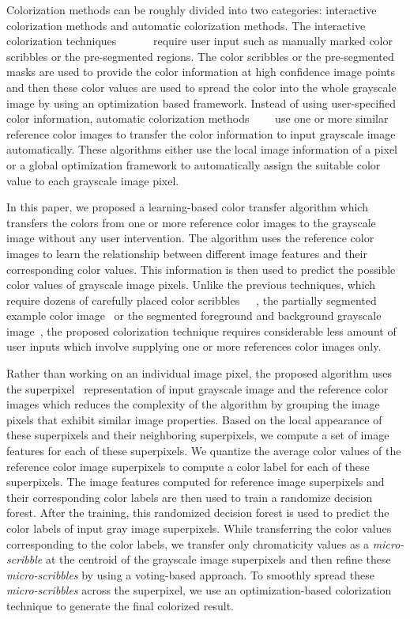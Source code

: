 \documentclass[twocolumn]{svjour3}          %
\begin{document}
Colorization methods can be roughly divided into two categories: interactive colorization methods and automatic colorization methods. The interactive colorization techniques~\cite{Levin04}~\cite{Irony05}~\cite{Huang05}~\cite{Yatziv06}~\cite{Luan07}~\cite{Alex11} require user input such as manually marked color scribbles or the pre-segmented regions. The color scribbles or the pre-segmented masks are used to provide the color information at high confidence image points and then these color values are used to spread the color into the whole grayscale image by using an optimization based framework. Instead of using user-specified color information, automatic colorization methods~\cite{Aaron01}~\cite{Welsh02}~\cite{Charpiat08}~\cite{Liu08} use one or more similar reference color images to transfer the color information to input grayscale image automatically. These algorithms either use the local image information of a pixel or a global optimization framework to automatically assign the suitable color value to each grayscale image pixel. 

In this paper, we proposed a learning-based color transfer algorithm which transfers the colors from one or more reference color images to the grayscale image without any user intervention. The algorithm uses the reference color images to learn the relationship between different image features and their corresponding color values. This information is then used to predict the possible color values of grayscale image pixels.  Unlike the previous techniques, which require dozens of carefully placed color scribbles~\cite{Levin04}~\cite{Yatziv06}~\cite{Luan07}, the partially segmented example color image~\cite{Irony05} or the segmented foreground and background grayscale image~\cite{Alex11}, the proposed colorization technique requires considerable less amount of user inputs which involve supplying one or more references color images only. 

Rather than working on an individual image pixel, the proposed algorithm uses the superpixel~\cite{Alex09} representation of input grayscale image and the reference color images which reduces the complexity of the algorithm by grouping the image pixels that exhibit similar image properties. Based on the local appearance of these superpixels and their neighboring superpixels, we compute a set of image features for each of these superpixels. We quantize the average color values of the reference color image superpixels to compute a color label for each of these superpixels. The image features computed for reference image superpixels and their corresponding color labels are then used to train a randomize decision forest. After the training, this randomized decision forest is used to predict the color labels of input gray image superpixels. While transferring the color values corresponding to the color labels, we transfer only chromaticity values as a \emph{micro-scribble} at the centroid of the grayscale image superpixels and then refine these \emph{micro-scribbles} by using a voting-based approach. To smoothly spread these \emph{micro-scribbles} across the superpixel, we use an optimization-based colorization technique to generate the final colorized result.
\end{document}
